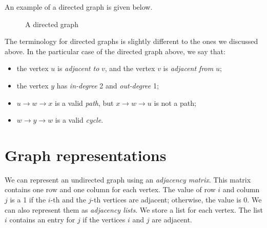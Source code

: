 \documentclass[a4paper, openany]{memoir}
\begin{document}
An example of a directed graph is given below.
\begin{figure}[H]
    \centering
    \caption{A directed graph}
\end{figure}
The terminology for directed graphs is slightly different to the ones we discussed above. In the particular case of the directed graph above, we say that:
\begin{itemize}
    \item the vertex $u$ is \emph{adjacent to} $v$, and the vertex $v$ is \emph{adjacent from} $u$;
    \item the vertex $y$ has \emph{in-degree} 2 and \emph{out-degree} 1;
    \item $u \to w \to x$ is a valid \emph{path}, but $x \to w \to u$ is not a path;
    \item $w \to y \to w$ is a valid \emph{cycle}.
\end{itemize}
\newpage

\section{Graph representations}
We can represent an undirected graph using an \emph{adjacency matrix}. This matrix contains one row and one column for each vertex. The value of row $i$ and column $j$ is a 1 if the $i$-th and the $j$-th vertices are adjacent; otherwise, the value is 0. We can also represent them as \emph{adjacency lists}. We store a list for each vertex. The list $i$ contains an entry for $j$ if the vertices $i$ and $j$ are adjacent.
\end{document}
